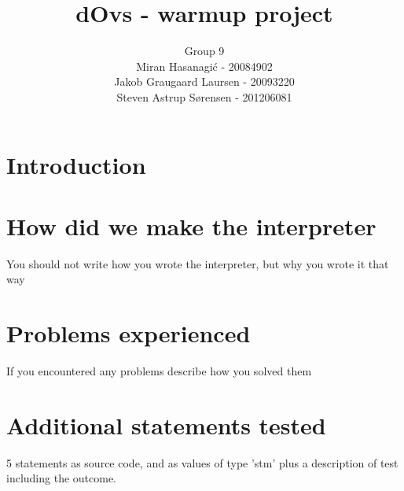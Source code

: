 \documentclass[a4paper]{article}
\title{dOvs - warmup project}
\author{
  Group 9 \\
  Miran Hasanagi\'{c} - 20084902 \\
  Jakob Graugaard Laursen - 20093220\\
  Steven Astrup S\o rensen - 201206081
}
\begin{document}
\maketitle

\section{Introduction}

\section{How did we make the interpreter}
You should not write how you wrote the interpreter, but why you wrote it that way

\section{Problems experienced}
If you encountered any problems describe how you solved them

\section{Additional statements tested}
5 statements as source code, and as values of type 'stm' plus a description of test including the outcome.
\end{document}
